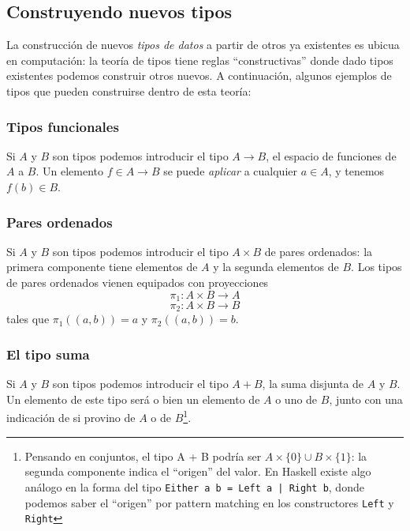 \documentclass[11pt]{article} %
\begin{document}

\subsection{Construyendo nuevos tipos}
La construcción de nuevos \textit{tipos de datos} a partir de otros ya existentes es ubicua en computación: la teoría de tipos tiene reglas ``constructivas'' donde dado tipos existentes podemos construir otros nuevos. A continuación, algunos ejemplos de tipos que pueden construirse dentro de esta teoría:


\subsubsection{Tipos funcionales}
Si $A$ y $B$ son tipos podemos introducir el tipo $A \rightarrow B$, el espacio de funciones de $A$ a $B$. Un elemento $f \in A \rightarrow B$ se puede \textit{aplicar} a cualquier $a \in A$, y tenemos $f(b) \in B$.

\subsubsection{Pares ordenados}
Si $A$ y $B$ son tipos podemos introducir el tipo $A \times B$ de pares ordenados: la primera componente tiene elementos de $A$ y la segunda elementos de $B$. Los tipos de pares ordenados vienen equipados con proyecciones \[ \pi_1 : A \times B → A \] \[\pi_2 : A \times B → B \] tales que $\pi_1 ((a,b)) = a$ y $\pi_2 ((a,b)) = b$.

\subsubsection{El tipo suma}
Si $A$ y $B$ son tipos podemos introducir el tipo $A + B$, la suma disjunta de $A$ y $B$. Un elemento de este tipo será o bien un elemento de $A$ o uno de $B$, junto con una indicación de si provino de $A$ o de $B$\footnote{Pensando en conjuntos, el tipo A + B podría ser $A \times \{0\} \cup B \times \{1\}$: la segunda componente indica el ``origen'' del valor. En Haskell existe algo análogo en la forma del tipo \texttt{Either a b = Left a | Right b}, donde podemos saber el ``origen'' por pattern matching en los constructores \texttt{Left} y \texttt{Right}}. 
\end{document}
